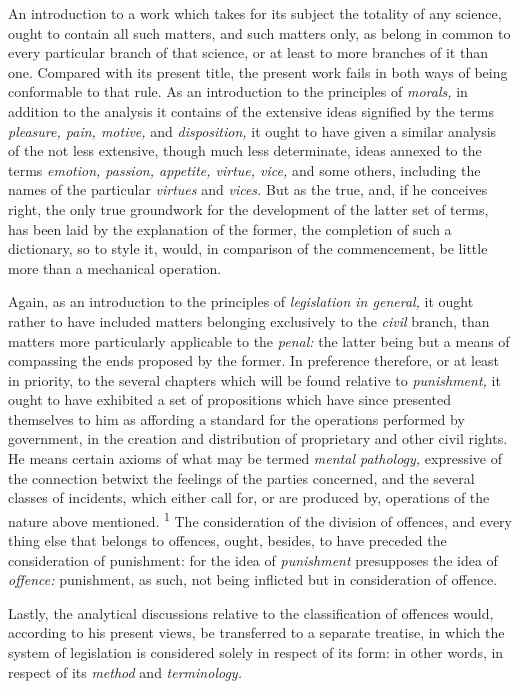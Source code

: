 \documentclass[12pt]{report}
\begin{document}
An introduction to a work which takes for its subject the totality of
any science, ought to contain all such matters, and such matters only,
as belong in common to every particular branch of that science, or at
least to more branches of it than one. Compared with its present title,
the present work fails in both ways of being conformable to that rule.
As an introduction to the principles of \emph{morals,} in addition to
the analysis it contains of the extensive ideas signified by the terms
\emph{pleasure, pain, motive,} and \emph{disposition,} it ought to have
given a similar analysis of the not less extensive, though much less
determinate, ideas annexed to the terms \emph{emotion, passion,
appetite, virtue, vice,} and some others, including the names of the
particular \emph{virtues} and \emph{vices.} But as the true, and, if he
conceives right, the only true groundwork for the development of the
latter set of terms, has been laid by the explanation of the former, the
completion of such a dictionary, so to style it, would, in comparison of
the commencement, be little more than a mechanical operation.

Again, as an introduction to the principles of \emph{legislation in
general,} it ought rather to have included matters belonging exclusively
to the \emph{civil} branch, than matters more particularly applicable to
the \emph{penal:} the latter being but a means of compassing the ends
proposed by the former. In preference therefore, or at least in
priority, to the several chapters which will be found relative to
\emph{punishment,} it ought to have exhibited a set of propositions
which have since presented themselves to him as affording a standard for
the operations performed by government, in the creation and distribution
of proprietary and other civil rights. He means certain axioms of what
may be termed \emph{mental pathology,} expressive of the connection
betwixt the feelings of the parties concerned, and the several classes
of incidents, which either call for, or are produced by, operations of
the nature above mentioned. \textsuperscript{1} The consideration of the
division of offences, and every thing else that belongs to offences,
ought, besides, to have preceded the consideration of punishment: for
the idea of \emph{punishment} presupposes the idea of \emph{offence:}
punishment, as such, not being inflicted but in consideration of
offence.

Lastly, the analytical discussions relative to the classification of
offences would, according to his present views, be transferred to a
separate treatise, in which the system of legislation is considered
solely in respect of its form: in other words, in respect of its
\emph{method} and \emph{terminology.}
\end{document}
